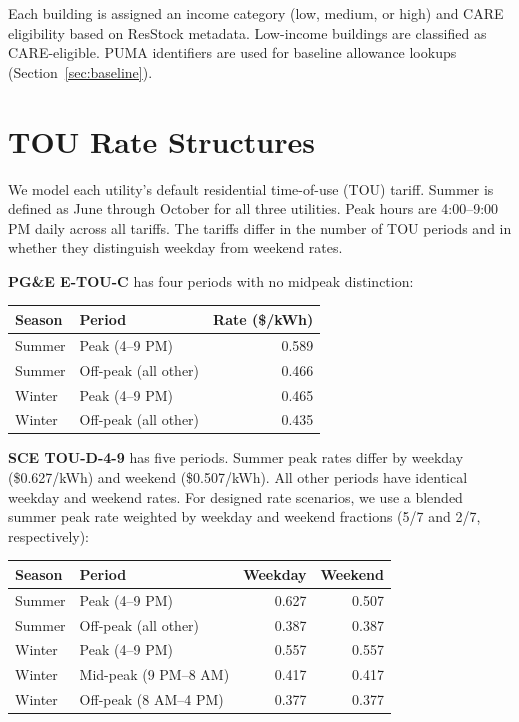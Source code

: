 \documentclass[11pt]{article}
\begin{document}
Each building is assigned an income category (low, medium, or high) and CARE eligibility based on ResStock metadata. Low-income buildings are classified as CARE-eligible. PUMA identifiers are used for baseline allowance lookups (Section~\ref{sec:baseline}).

\section{TOU Rate Structures}
\label{sec:tou}

We model each utility's default residential time-of-use (TOU) tariff. Summer is defined as June through October for all three utilities. Peak hours are 4:00--9:00 PM daily across all tariffs. The tariffs differ in the number of TOU periods and in whether they distinguish weekday from weekend rates.

\textbf{PG\&E E-TOU-C} has four periods with no midpeak distinction:

\begin{table}[htbp]
\centering
\small
\begin{tabular}{l l r}
\toprule
\textbf{Season} & \textbf{Period} & \textbf{Rate (\$/kWh)} \\
\midrule
Summer & Peak (4--9 PM) & 0.589 \\
Summer & Off-peak (all other) & 0.466 \\
Winter & Peak (4--9 PM) & 0.465 \\
Winter & Off-peak (all other) & 0.435 \\
\bottomrule
\end{tabular}
\end{table}

\textbf{SCE TOU-D-4-9} has five periods. Summer peak rates differ by weekday (\$0.627/kWh) and weekend (\$0.507/kWh). All other periods have identical weekday and weekend rates. For designed rate scenarios, we use a blended summer peak rate weighted by weekday and weekend fractions (5/7 and 2/7, respectively):

\begin{table}[htbp]
\centering
\small
\begin{tabular}{l l r r}
\toprule
\textbf{Season} & \textbf{Period} & \textbf{Weekday} & \textbf{Weekend} \\
\midrule
Summer & Peak (4--9 PM) & 0.627 & 0.507 \\
Summer & Off-peak (all other) & 0.387 & 0.387 \\
Winter & Peak (4--9 PM) & 0.557 & 0.557 \\
Winter & Mid-peak (9 PM--8 AM) & 0.417 & 0.417 \\
Winter & Off-peak (8 AM--4 PM) & 0.377 & 0.377 \\
\bottomrule
\end{tabular}
\end{table}
\end{document}
